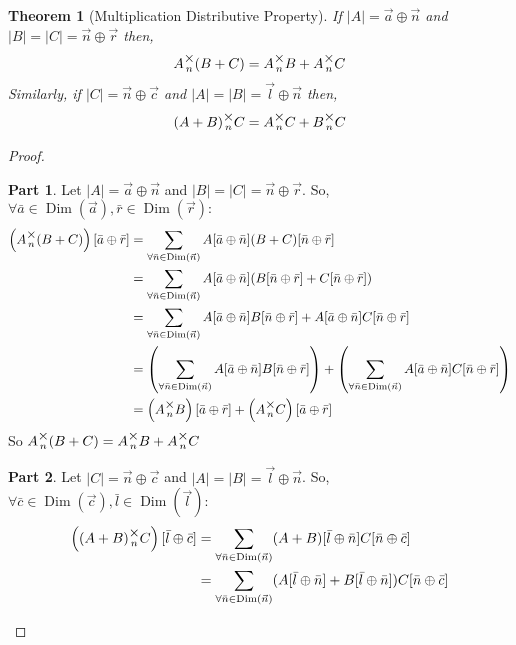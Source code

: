 \documentclass[12pt]{book}
\theoremstyle{plain}
\newtheorem{theorem}{Theorem}[chapter]
\theoremstyle{definition}
\theoremstyle{ppart}
\newtheorem{ppart}{Part}
\theoremstyle{case}
\theoremstyle{solution}
\DeclareMathOperator{\Dim}{Dim}
\newcommand{\mmult}[1]{\text{\raisebox{1ex}{$\underset{#1}{\times}$}}}
\newcommand{\shape}[1]{\left|#1\right|}
\begin{document}
\begin{landscape}
\begin{theorem}[Multiplication Distributive Property]
If $\shape{A} = \vec{a} \oplus \vec{n}$ and $\shape{B}=\shape{C}=\vec{n} \oplus \vec{r}$ then,
\[ A \mmult{n} (B + C) = A \mmult{n} B + A \mmult{n} C \]
Similarly, if $\shape{C} = \vec{n} \oplus \vec{c}$ and $\shape{A}=\shape{B}=\vec{l} \oplus \vec{n}$ then,
\[ (A + B) \mmult{n} C = A \mmult{n} C + B \mmult{n} C \]
\end{theorem}
\begin{proof}
\begin{ppart}
Let $\shape{A} = \vec{a} \oplus \vec{n}$ and $\shape{B}=\shape{C}=\vec{n} \oplus \vec{r}$.
So, $\forall \bar{a} \in \Dim(\vec{a}), \bar{r} \in \Dim(\vec{r}) :$
\begin{align*}
 \left( A \mmult{n} (B + C) \right)[\bar{a} \oplus \bar{r}]
 &= \sum_{\forall \bar{n} \in \Dim(\vec{n})}
    A[\bar{a} \oplus \bar{n}] (B + C)[\bar{n} \oplus \bar{r}] \\
 &= \sum_{\forall \bar{n} \in \Dim(\vec{n})}
    A[\bar{a} \oplus \bar{n}] (B[\bar{n} \oplus \bar{r}] + C[\bar{n} \oplus \bar{r}]) \\
 &= \sum_{\forall \bar{n} \in \Dim(\vec{n})}
    A[\bar{a} \oplus \bar{n}] B[\bar{n} \oplus \bar{r}]
  + A[\bar{a} \oplus \bar{n}]C[\bar{n} \oplus \bar{r}] \\
 &= \left( \sum_{\forall \bar{n} \in \Dim(\vec{n})}
    A[\bar{a} \oplus \bar{n}] B[\bar{n} \oplus \bar{r}] \right)
    +
    \left( \sum_{\forall \bar{n} \in \Dim(\vec{n})}
    A[\bar{a} \oplus \bar{n}]C[\bar{n} \oplus \bar{r}] \right) \\
 &= \left( A \mmult{n} B \right)[\bar{a} \oplus \bar{r}] +
     \left( A \mmult{n} C \right)[\bar{a} \oplus \bar{r}]
\end{align*}
So $A \mmult{n} (B + C) = A \mmult{n} B + A \mmult{n} C$
\end{ppart}
\begin{ppart}
Let $\shape{C} = \vec{n} \oplus \vec{c}$ and $\shape{A}=\shape{B}=\vec{l} \oplus \vec{n}$.
So, $\forall \bar{c} \in \Dim(\vec{c}), \bar{l} \in \Dim(\vec{l}) :$
\begin{align*}
 \left( (A + B) \mmult{n} C \right)[\bar{l} \oplus \bar{c}]
 &= \sum_{\forall \bar{n} \in \Dim(\vec{n})}
    (A+B)[\bar{l} \oplus \bar{n}] C[\bar{n} \oplus \bar{c}] \\
 &= \sum_{\forall \bar{n} \in \Dim(\vec{n})}
    (A[\bar{l} \oplus \bar{n}]+B[\bar{l} \oplus \bar{n}])C[\bar{n} \oplus \bar{c}] \\

\end{align*}
\end{ppart}
\end{proof}
\end{landscape}
\end{document}
